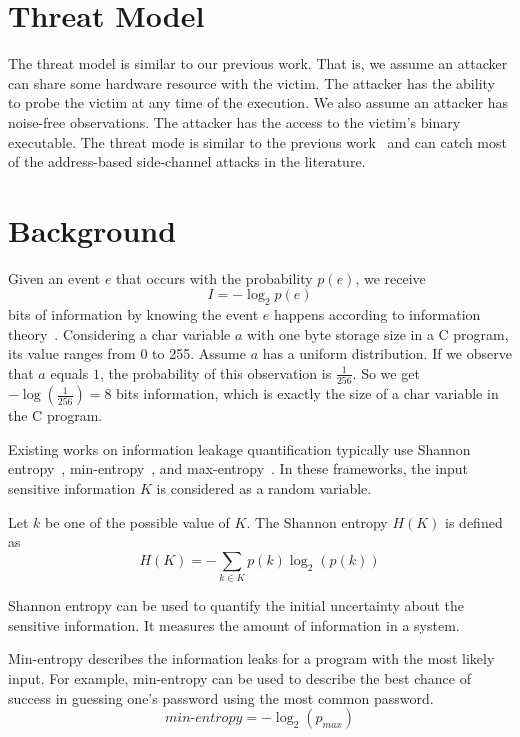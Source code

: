 \section{Threat Model}

The threat model is similar to our previous work. That is, we assume
an attacker can share some hardware resource with the victim. The attacker has
the ability to probe the victim at any time of the execution. We also assume
an attacker has noise-free observations. The attacker has the access to the victim's
binary executable. The threat mode is similar to
the previous work~\cite{203878,182946,Brotzman19Casym} and can catch most of
the address-based side-channel attacks in the literature.


\section{Background}
Given an event $e$ that occurs with the probability $p(e)$, we receive
\begin{displaymath}
    I = - \log_2p(e)
\end{displaymath}
bits of information by knowing the event $e$ happens according to information theory~\cite{shannon1948mathematical}.
Considering a char variable $a$
with one byte storage size in a C program, its value ranges from 0 to 255.
Assume $a$ has a uniform distribution. If we observe that
$a$ equals $1$, the probability of this observation is $\frac{1}{256}$. So
we get $-\log(\frac{1}{256}) = 8$ bits information, which is exactly the size
of a char variable in the C program.

Existing works on information leakage quantification typically use Shannon
entropy~\cite{clark2007static,Wichelmann:2018:MFF:3274694.3274741},
min-entropy~\cite{10.1007/978-3-642-00596-1_21}, and max-entropy~\cite{182946,
    Doychev:2017:RAS:3062341.3062388}. In these frameworks, the input sensitive
information $K$ is considered as a random variable.

Let $k$ be one of the possible
value of $K$. The Shannon entropy $H(K)$ is defined as
\begin{displaymath}
    H(K) = - \sum_{k {\in} K}p(k)\log_2(p(k))
\end{displaymath}

Shannon entropy can be used to quantify the initial uncertainty about the
sensitive information. It measures the amount of information in a system.

Min-entropy describes the information leaks for a program with the most likely input.
For example, min-entropy can be used to describe the
best chance of success in guessing one's password using the
most common password. %
\begin{displaymath}
    \mathit{min\text{-}entropy} = - \log_2(p_{\mathit{max}})
\end{displaymath}

